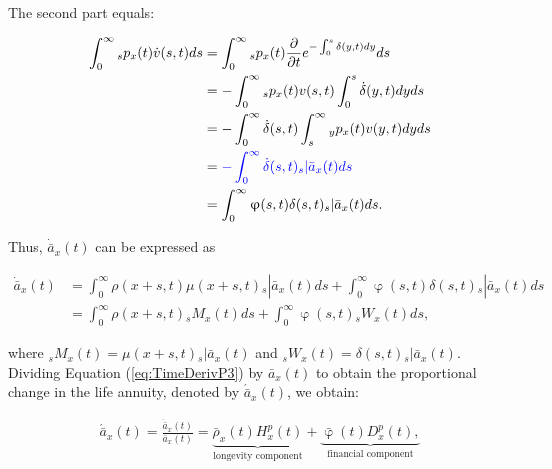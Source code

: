 \documentclass[12pt]{article}
\newcommand{\revision}[1]{\textcolor{blue}{#1}}
\begin{document}
The second part equals:

\begin{equation}\label{eq:TimeDerivP2}
\begin{split}
\int_0^\infty {}_sp_x(t) \dot{v}(s,t)ds &= \int_0^\infty {}_sp_x(t)  \frac{\partial  }{\partial t} e^{-\int_0^{s}{\delta}(y,t)dy}ds\\
&= -\int_0^\infty {}_sp_x(t) v(s,t) \int_0^{s}\dot{\delta}(y,t)dy ds\\
&= -\int_0^\infty  \dot{\delta}(s,t)\int_s^{\infty} {}_yp_x(t) v(y,t) dy ds\\
&= \revision{-\int_0^\infty  \dot{\delta}(s,t){}_s|\bar{a}_x(t) ds}\\
&= \int_0^\infty  \upvarphi(s,t) \delta(s,t)  {}_s|\bar{a}_x(t) ds.\\
\end{split}
\end{equation}


Thus, $\dot{\bar{a}} _x(t)$ can be expressed as


\begin{equation}\label{eq:TimeDerivP3}
\begin{split}
\dot{\bar{a}}_{x}(t) &=  \int_0^\infty \rho(x+s,t) \mu(x+s,t){}_s|\bar{a}_x(t) ds +\int_0^\infty  \upvarphi(s,t) \delta(s,t)  {}_s|\bar{a}_x(t) ds\\
&= \int_0^\infty \rho(x+s,t) {}_sM_x(t)  ds +\int_0^\infty  \upvarphi(s,t) {}_sW_x(t)  ds,
\end{split}
\end{equation}


where ${}_sM_x(t)= \mu(x+s,t){}_s|\bar{a}_x(t)$ and ${}_sW_x(t)=\delta(s,t)  {}_s|\bar{a}_x(t)$. Dividing Equation (\ref{eq:TimeDerivP3}) by $\bar{a}_x(t)$ to obtain the proportional change in the life annuity, denoted by $\acute{\bar{a}}_x(t)$, we obtain:


\begin{equation}\label{eq:TimeDerivP}
\begin{split}
 \acute{\bar{a}}_x(t) = \frac{\dot{\bar{a}}_x(t)}{\bar{a}_x(t)}  = 
 \underbrace{\bar{\rho}_x(t){H}^{p}_x(t)}_\text{longevity component}
 +\underbrace{\bar{\upvarphi}(t){D}^{p}_x(t),}_\text{financial component}
\end{split}
\end{equation}
\end{document}
